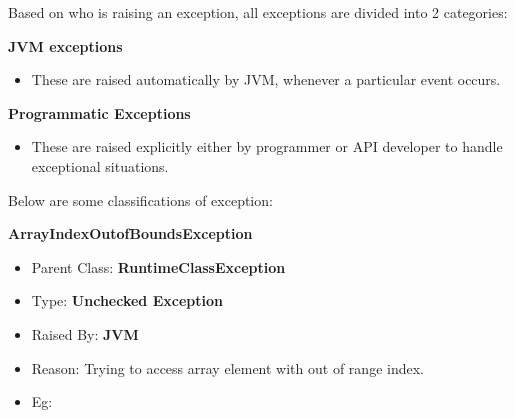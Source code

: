 \setlength{\columnsep}{3pt}
\begin{flushleft}
	
	Based on who is raising an exception, all exceptions are divided into 2 categories:

	\textbf{JVM exceptions}
	\begin{itemize}
		\item These are raised automatically by JVM, whenever a particular event occurs.
	\end{itemize}

	\item \textbf{Programmatic Exceptions}
	\begin{itemize}
		\item These are raised explicitly either by programmer or API developer to handle exceptional situations.
	\end{itemize}

	Below are some classifications of exception:
	
	
	\newpage
	\textbf{ArrayIndexOutofBoundsException}
	\begin{itemize}
		\item Parent Class: \textbf{RuntimeClassException}
		\item Type: \textbf{Unchecked Exception}
		\item Raised By: \textbf{JVM}
		\item Reason: Trying to access array element with out of range index.
		\item Eg:
		\bigskip
		\bigskip
\end{itemize}
\end{flushleft}
